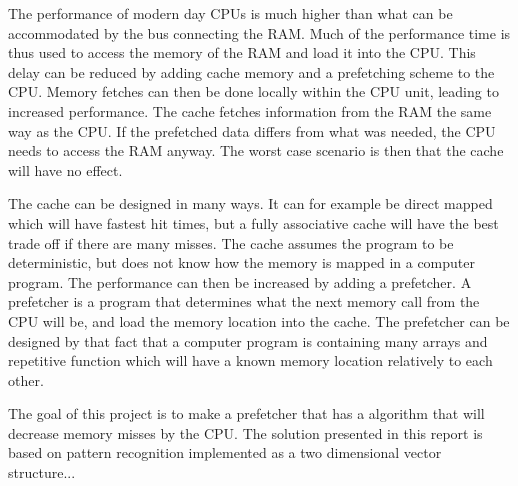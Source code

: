 The performance of modern day CPUs is much higher than what can be accommodated by the bus connecting the RAM. Much of the performance time is thus used to access the memory of the RAM and load it into the CPU. This delay can be reduced by adding cache memory and a prefetching scheme to the CPU. Memory fetches can then be done locally within the CPU unit, leading to increased performance. The cache fetches information from the RAM the same way as the CPU. If the prefetched data differs from what was needed, the CPU needs to access the RAM anyway. The worst case scenario is then that the cache will have no effect.




The cache can be designed in many ways. It can for example be direct mapped which will have fastest hit times, but a fully associative cache will have the best trade off if there are many misses. The cache assumes the program to be deterministic, but does not know how the memory is mapped in a computer program. The performance can then be increased by adding a prefetcher. A prefetcher is a program that determines what the next memory call from the CPU will be, and load the memory location into the cache. The prefetcher can be designed by that fact that a computer program is containing many arrays and repetitive function which will have a known memory location relatively to each other.

The goal of this project is to make a prefetcher that has a algorithm that will decrease memory misses by the CPU. The solution presented in this report is based on pattern recognition implemented as a two dimensional vector structure...
